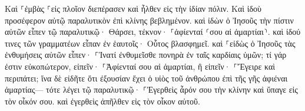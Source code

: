 \documentclass{openreader}
\begin{document}
Καὶ ⸀ἐμβὰς ⸀εἰς πλοῖον διεπέρασεν καὶ ἦλθεν εἰς τὴν ἰδίαν πόλιν. 
Καὶ ἰδοὺ προσέφερον αὐτῷ παραλυτικὸν ἐπὶ κλίνης βεβλημένον. καὶ ἰδὼν ὁ Ἰησοῦς τὴν πίστιν αὐτῶν εἶπεν τῷ παραλυτικῷ· Θάρσει, τέκνον· ⸀ἀφίενταί ⸂σου αἱ ἁμαρτίαι⸃. 
καὶ ἰδού τινες τῶν γραμματέων εἶπαν ἐν ἑαυτοῖς· Οὗτος βλασφημεῖ. 
καὶ ⸀εἰδὼς ὁ Ἰησοῦς τὰς ἐνθυμήσεις αὐτῶν εἶπεν· ⸀Ἱνατί ἐνθυμεῖσθε πονηρὰ ἐν ταῖς καρδίαις ὑμῶν; 
τί γάρ ἐστιν εὐκοπώτερον, εἰπεῖν· ⸀Ἀφίενταί σου αἱ ἁμαρτίαι, ἢ εἰπεῖν· ⸀Ἔγειρε καὶ περιπάτει; 
ἵνα δὲ εἰδῆτε ὅτι ἐξουσίαν ἔχει ὁ υἱὸς τοῦ ἀνθρώπου ἐπὶ τῆς γῆς ἀφιέναι ἁμαρτίας— τότε λέγει τῷ παραλυτικῷ· ⸀Ἐγερθεὶς ἆρόν σου τὴν κλίνην καὶ ὕπαγε εἰς τὸν οἶκόν σου. 
καὶ ἐγερθεὶς ἀπῆλθεν εἰς τὸν οἶκον αὐτοῦ. 
\end{document}
